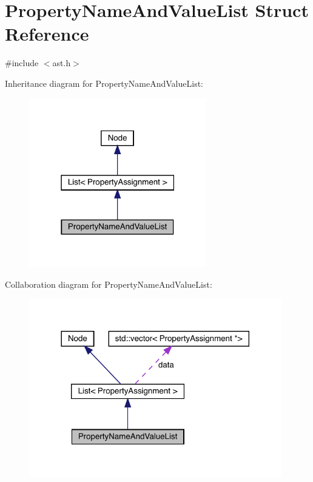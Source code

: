 \hypertarget{struct_property_name_and_value_list}{}\section{Property\+Name\+And\+Value\+List Struct Reference}
\label{struct_property_name_and_value_list}


{\ttfamily \#include $<$ast.\+h$>$}



Inheritance diagram for Property\+Name\+And\+Value\+List\+:
\nopagebreak
\begin{figure}[H]
\begin{center}
\leavevmode
\includegraphics[width=219pt]{struct_property_name_and_value_list__inherit__graph}
\end{center}
\end{figure}


Collaboration diagram for Property\+Name\+And\+Value\+List\+:
\nopagebreak
\begin{figure}[H]
\begin{center}
\leavevmode
\includegraphics[width=312pt]{struct_property_name_and_value_list__coll__graph}
\end{center}
\end{figure}
